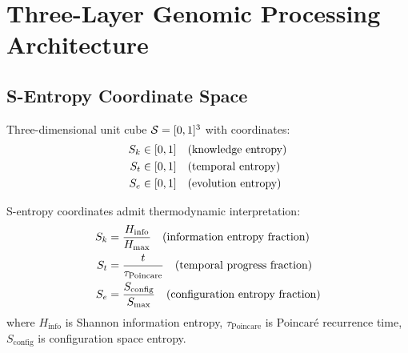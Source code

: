 \section{Three-Layer Genomic Processing Architecture}

\subsection{S-Entropy Coordinate Space}

\begin{definition}
\label{def:s_entropy_space}
Three-dimensional unit cube $\mathcal{S} = [0,1]^3$ with coordinates:
\begin{align}
S_k &\in [0,1] \quad \text{(knowledge entropy)} \\
S_t &\in [0,1] \quad \text{(temporal entropy)} \\
S_e &\in [0,1] \quad \text{(evolution entropy)}
\end{align}
\end{definition}

\begin{theorem}
\label{thm:s_entropy_thermo}
S-entropy coordinates admit thermodynamic interpretation:
\begin{align}
S_k &= \frac{H_{\text{info}}}{H_{\text{max}}} \quad \text{(information entropy fraction)} \\
S_t &= \frac{t}{\tau_{\text{Poincare}}} \quad \text{(temporal progress fraction)} \\
S_e &= \frac{S_{\text{config}}}{S_{\text{max}}} \quad \text{(configuration entropy fraction)}
\end{align}
where $H_{\text{info}}$ is Shannon information entropy, $\tau_{\text{Poincare}}$ is Poincaré recurrence time, $S_{\text{config}}$ is configuration space entropy.
\end{theorem}

